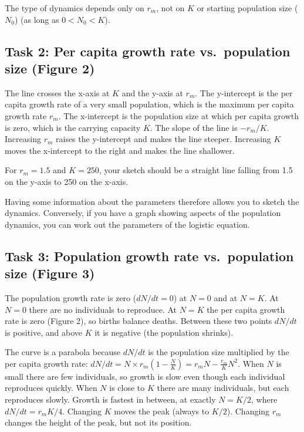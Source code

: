 \documentclass[
  a4paper]{book}
\begin{document}
The type of dynamics depends only on \(r_m\), not on \(K\) or starting population size (\(N_0\)) (as long as \(0 < N_0 < K\)).

\subsection{Task 2: Per capita growth rate vs.~population size (Figure 2)}\label{task-2-per-capita-growth-rate-vs.-population-size-figure-2}

The line crosses the x-axis at \(K\) and the y-axis at \(r_m\). The y-intercept is the per capita growth rate of a very small population, which is the maximum per capita growth rate \(r_m\). The x-intercept is the population size at which per capita growth is zero, which is the carrying capacity \(K\). The slope of the line is \(-r_m/K\). Increasing \(r_m\) raises the y-intercept and makes the line steeper. Increasing \(K\) moves the x-intercept to the right and makes the line shallower.

For \(r_m = 1.5\) and \(K = 250\), your sketch should be a straight line falling from 1.5 on the y-axis to 250 on the x-axis.

Having some information about the parameters therefore allows you to sketch the dynamics. Conversely, if you have a graph showing aspects of the population dynamics, you can work out the parameters of the logistic equation.

\subsection{Task 3: Population growth rate vs.~population size (Figure 3)}\label{task-3-population-growth-rate-vs.-population-size-figure-3}

The population growth rate is zero (\(dN/dt = 0\)) at \(N = 0\) and at \(N = K\). At \(N = 0\) there are no individuals to reproduce. At \(N = K\) the per capita growth rate is zero (Figure 2), so births balance deaths. Between these two points \(dN/dt\) is positive, and above \(K\) it is negative (the population shrinks).

The curve is a parabola because \(dN/dt\) is the population size multiplied by the per capita growth rate: \(dN/dt = N \times r_m\left(1 - \frac{N}{K}\right) = r_m N - \frac{r_m}{K}N^2\). When \(N\) is small there are few individuals, so growth is slow even though each individual reproduces quickly. When \(N\) is close to \(K\) there are many individuals, but each reproduces slowly. Growth is fastest in between, at exactly \(N = K/2\), where \(dN/dt = r_m K/4\). Changing \(K\) moves the peak (always to \(K/2\)). Changing \(r_m\) changes the height of the peak, but not its position.
\end{document}
